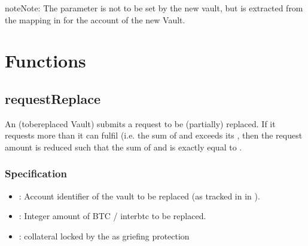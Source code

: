 \documentclass[a4paper,10pt,english]{sphinxmanual}
\begin{document}
\begin{sphinxadmonition}{note}{Note:}
The  parameter is not to be set by the new vault, but is extracted from the  mapping in  for the account of the new Vault.
\end{sphinxadmonition}


\section{Functions}
\label{\detokenize{spec/replace:functions}}

\subsection{requestReplace}
\label{\detokenize{spec/replace:requestreplace}}\label{\detokenize{spec/replace:id4}}
An  (to\sphinxhyphen{}be\sphinxhyphen{}replaced Vault) submits a request to be (partially) replaced. If it requests more than it can fulfil (i.e. the sum of  and  exceeds its , then the request amount is reduced such that the sum of  and  is exactly equal to .


\subsubsection{Specification}
\label{\detokenize{spec/replace:specification}}


\begin{itemize}
\item {} 
: Account identifier of the vault to be replaced (as tracked in  in {\hyperref[\detokenize{spec/vault-registry:vault-registry}]{}}).

\item {} 
: Integer amount of BTC / interbtc to be replaced.

\item {} 
: collateral locked by the  as griefing protection

\end{itemize}
\end{document}
